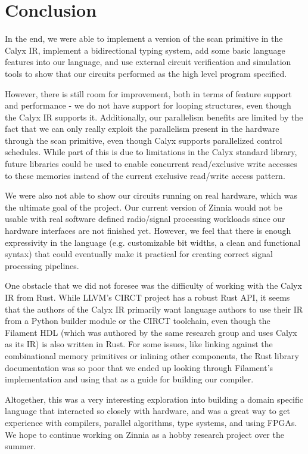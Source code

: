 \documentclass[12pt]{article}
\begin{document}
\section{Conclusion}
In the end, we were able to implement a version of the scan primitive in the Calyx IR, implement a bidirectional
typing system, add some basic language features into our language, and use external circuit verification and simulation
tools to show that our circuits performed as the high level program specified.

However, there is still room for improvement, both in terms of feature support and performance - we do not have support for looping structures,
even though the Calyx IR supports it. Additionally, our parallelism benefits are limited by the fact that we can only really exploit
the parallelism present in the hardware through the scan primitive, even though Calyx supports parallelized control schedules. While part of this
is due to limitations in the Calyx standard library, future libraries could be used to enable concurrent read/exclusive write
accesses to these memories instead of the current exclusive read/write access pattern.

We were also not able to show our circuits running on real hardware, which was the ultimate goal of the project.
Our current version of Zinnia would not be usable with real software defined radio/signal processing workloads since our hardware interfaces are not finished yet.
However, we feel that there is enough expressivity in the language (e.g. customizable bit widths, a clean and functional syntax)
that could eventually make it practical for creating correct signal processing pipelines.

One obstacle that we did not foresee was the difficulty of working with the Calyx IR from Rust. While LLVM's CIRCT project
has a robust Rust API, it seems that the authors of the Calyx IR primarily want language authors to use their IR from
a Python builder module or the CIRCT toolchain, even though the Filament HDL (which was authored by the same research
group and uses Calyx as its IR) is also written in Rust. For some issues, like linking against the combinational memory
primitives or inlining other components, the Rust library documentation was so poor that we ended up looking through
Filament's implementation and using that as a guide for building our compiler.

Altogether, this was a very interesting exploration into building a domain specific language that interacted so closely
with hardware, and was a great way to get experience with compilers, parallel algorithms, type systems, and using FPGAs.
We hope to continue working on Zinnia as a hobby research project over the summer.
\end{document}
